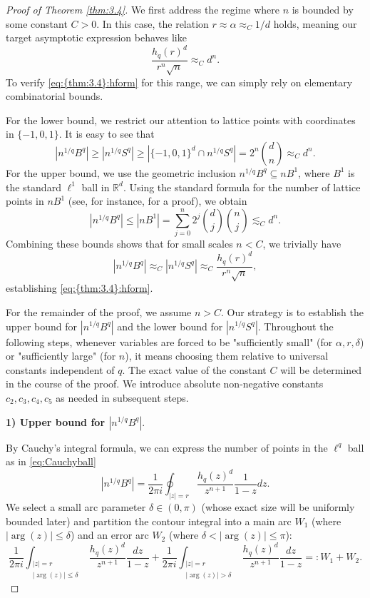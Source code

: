 \documentclass[a4paper,twoside, reqno]{amsart}
\numberwithin{equation}{section}
\theoremstyle{definition}%
\theoremstyle{definition}
\theoremstyle{definition}%
\theoremstyle{definition}
\newcommand{\R}{\mathbb{R}}
\begin{document}
\begin{proof}[Proof of Theorem \ref{thm:3.4}]

We first address the regime where $n$ is bounded by some constant $C > 0$. 
In this case, the relation $r \approx \alpha \approx_C 1/d$ holds, meaning our target asymptotic expression behaves like
\[
\frac{h_q(r)^d}{r^n \sqrt{n}} \approx_C d^n.
\]
To verify \eqref{eq:{thm:3.4}:hform} for this range, we can simply rely on elementary combinatorial bounds. 

For the lower bound, we restrict our attention to lattice points with coordinates in $\{-1, 0, 1\}$. It is easy to see that
\[
    |n^{1/q}B^q| \geq |n^{1/q}S^q| \geq \left| \{-1,0,1\}^d \cap n^{1/q}S^q \right| = 2^n \binom{d}{n} \approx_C d^n.
\]
For the upper bound, we use the geometric inclusion $n^{1/q}B^q \subseteq n B^1$, where $B^1$ is the standard $\ell^1$ ball in $\R^d$. 
Using the standard formula for the number of lattice points in $n B^1$ (see, for instance, \cite[Lemma 2.2]{Ni1} for a proof), we obtain
\[
    |n^{1/q}B^q| \leq |n B^1| = \sum_{j=0}^n 2^j \binom{d}{j}\binom{n}{j} \lesssim_C d^n.
\]
Combining these bounds shows that for small scales $n < C$, we trivially have 
\[
|n^{1/q}B^q| \approx_C |n^{1/q}S^q| \approx_C \frac{h_q(r)^d}{r^n \sqrt{n}},
\] 
establishing \eqref{eq:{thm:3.4}:hform}. 

For the remainder of the proof, we assume $n > C$. Our strategy is to establish the upper bound for $|n^{1/q}B^q|$ and the lower bound for $|n^{1/q}S^q|$. 
Throughout the following steps, whenever variables are forced to be "sufficiently small" (for $\alpha, r, \delta$) or "sufficiently large" (for $n$), it means choosing them relative to universal constants independent of $q$. The exact value of the constant $C$ will be determined in the course of the proof.
We introduce absolute non-negative constants $c_2, c_3, c_4, c_5$ as needed in subsequent steps.

\vspace{0.5cm}
\noindent \textbf{1) Upper bound for $|n^{1/q}B^q|$}. 

By Cauchy's integral formula, we can express the number of points in the $\ell^q$ ball as in \eqref{eq:Cauchyball}
\[
    |n^{1/q}B^q| = \frac{1}{2 \pi i} \oint_{|z|=r} \frac{h_q(z)^d}{z^{n+1}} \frac{1}{1-z} dz.
\]
We select a small arc parameter $\delta \in (0, \pi)$ (whose exact size will be uniformly bounded later) and partition the contour integral into a main arc $W_1$ (where $|\arg(z)| \leq \delta$) and an error arc $W_2$ (where $\delta < |\arg(z)| \leq \pi$):
\begin{equation} \label{eq:3.3}
    \frac{1}{2 \pi i} \int_{\substack{|z|=r \\ |\arg(z)| \leq \delta}} \frac{h_q(z)^d}{z^{n+1}} \frac{dz}{1-z} 
    + 
    \frac{1}{2 \pi i} \int_{\substack{|z|=r \\ |\arg(z)| > \delta}} \frac{h_q(z)^d}{z^{n+1}} \frac{dz}{1-z} 
    =: W_1 + W_2.
\end{equation}


\end{proof}
\end{document}
